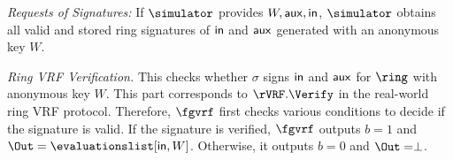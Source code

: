 \smallskip
	\noindent \textit{Requests of  Signatures:} If $ \simulator $ provides $ W, \mathsf{aux}, \mathsf{in}$, $ \simulator $  obtains all valid and stored ring signatures of $ \mathsf{in} $ and $ \mathsf{aux} $ generated with an anonymous key $ W $.  

\smallskip
	\noindent \textit{Ring VRF Verification.} This checks whether  $ \sigma $ signs $ \mathsf{in} $ and $ \mathsf{aux} $ for $ \ring $ with anonymous key $ W $. This part corresponds to $ \rVRF.\Verify $ in the real-world ring VRF protocol. Therefore,
$ \fgvrf $ first checks various conditions to decide if the signature is valid. If the signature is verified, $ \fgvrf $ outputs $ b = 1 $ and $ \Out = \evaluationslist[\msg, W] $. Otherwise, it outputs $ b = 0 $ and $ \Out = \perp $. 


